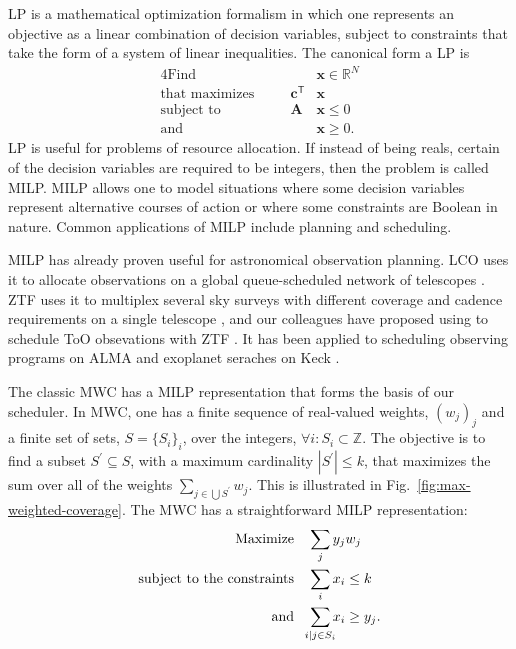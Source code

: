 \documentclass[twocolumn,times]{aastex631}
\begin{document}
\Ac{LP} is a mathematical optimization formalism in which one represents an objective as a linear combination of decision variables, subject to constraints that take the form of a system of linear inequalities. The canonical form a \ac{LP} is
%
\begin{alignat*}{4}
    \text{Find}\quad && &\mathbf{x} \in \mathbb{R}^N \\
    \text{that maximizes}\quad && \mathbf{c}^\mathsf{T} &\mathbf{x} \\
    \text{subject to}\quad && \mathbf{A} &\mathbf{x} \leq 0 \\
    \text{and}\quad && &\mathbf{x} \geq 0.
\end{alignat*}
%
\ac{LP} is useful for problems of resource allocation. If instead of being reals, certain of the decision variables are required to be integers, then the problem is called \acf{MILP}. \ac{MILP} allows one to model situations where some decision variables represent alternative courses of action or where some constraints are Boolean in nature. Common applications of \ac{MILP} include planning and scheduling.

\ac{MILP} has already proven useful for astronomical observation planning. \ac{LCO} uses it to allocate observations on a global queue-scheduled network of telescopes \citep{2014SPIE.9149E..0ES}. \ac{ZTF} uses it to multiplex several sky surveys with different coverage and cadence requirements on a single telescope \citep{2019PASP..131f8003B}, and our colleagues have proposed using to schedule \ac{ToO} obsevations with \ac{ZTF} \citep{2022ApJ...935...87P}. It has been applied to scheduling observing programs on \ac{ALMA} \citep{2016A&C....15...90S} and exoplanet seraches on Keck \citep{2024AJ....167...33H}.

The classic \ac{MWC} has a \ac{MILP} representation that forms the basis of our scheduler. In \ac{MWC}, one has a finite sequence of real-valued weights, $(w_j)_j$ and a finite set of sets, $S = \{S_i\}_i$, over the integers, $\forall i: S_i \subset \mathbb{Z}$. The objective is to find a subset $S^\prime \subseteq S$, with a maximum cardinality $|S^\prime| \leq k$, that maximizes the sum over all of the weights $\sum_{j \in \bigcup S^\prime} w_j$. This is illustrated in Fig.~\ref{fig:max-weighted-coverage}. The \ac{MWC} has a straightforward \ac{MILP} representation:
%
\begin{align*}
\text{Maximize}\quad &\sum_j y_j w_j \\
\text{subject to the constraints}\quad &\sum_i x_i \leq k \\
\text{and}\quad &\sum_{\mathclap{i \mid j \in S_i}} x_i \geq y_j.
\end{align*}
\end{document}
